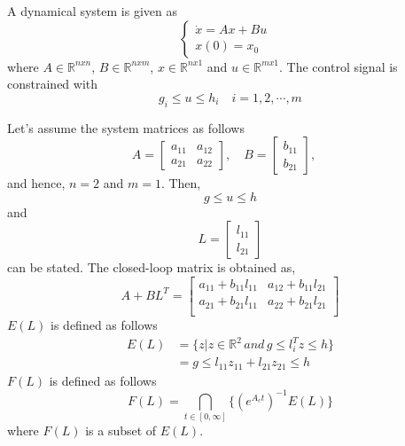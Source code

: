 A dynamical system is given as
\begin{equation}
    \begin{cases}
    \dot{x}=Ax+Bu&\\
    x(0)=x_0&
    \end{cases}
\end{equation}
where $A\in\mathbb{R}^{nxn}$, $B\in\mathbb{R}^{nxm}$, $x\in\mathbb{R}^{nx1}$ and $u\in\mathbb{R}^{mx1}$. The control signal is constrained with 
\begin{equation}
    g_i\leq u\leq h_i\quad i=1,2,\cdots,m
\end{equation}

Let's assume the system matrices as follows
\begin{equation}
    A=\begin{bmatrix}
        a_{11}& a_{12}\\
        a_{21}& a_{22}
    \end{bmatrix},\quad
    B=\begin{bmatrix}
        b_{11}\\b_{21}
    \end{bmatrix},\quad
\end{equation}
and hence, $n=2$ and $m=1$. Then,
\begin{equation}
    g\leq u\leq h
\end{equation}
and 
\begin{equation}
    L=\begin{bmatrix}
        l_{11}\\l_{21}
    \end{bmatrix}
\end{equation}
can be stated. The closed-loop matrix is obtained as,
\begin{equation}
    A+BL^T=\begin{bmatrix}
        a_{11} + b_{11}l_{11}& a_{12} + b_{11}l_{21}\\
        a_{21} + b_{21}l_{11}& a_{22} + b_{21}l_{21}\\
    \end{bmatrix}
\end{equation}
$E(L)$ is defined as follows
\begin{equation}
\begin{split}
    E(L)&=\{z|z\in\mathbb{R}^2\,and\,g\leq l_i^Tz\leq h\}\\
    &=g\leq l_{11}z_{11} + l_{21}z_{21}\leq h
\end{split}
\end{equation}
$F(L)$ is defined as follows
\begin{equation}
    F(L)=\bigcap\limits_{t\in[0,\infty]}\{(e^{A_ct})^{-1}E(L)\}
\end{equation}
where $F(L)$ is a subset of $E(L)$.

